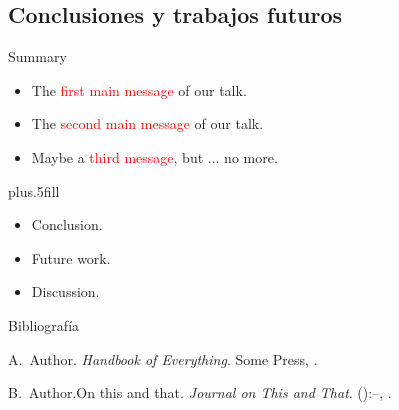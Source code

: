 \documentclass{beamer}
\begin{document}
\subsection{Conclusiones y trabajos futuros}

\begin{frame}{Summary}
	\begin{itemize}
		\item The \textcolor{red}{first main message} of our talk.
		\item The \textcolor{red}{second main message} of our talk.
		\item Maybe a \textcolor{red}{third message}, but ... no more.
	\end{itemize}
	\vskip0pt plus.5fill
	\begin{itemize}
		\item Conclusion.
	\end{itemize}
	\begin{itemize}
		\item Future work.
		\item Discussion.
	\end{itemize}
\end{frame}

\begin{frame}{Bibliografía}
	\begin{thebibliography}{2}
		\beamertemplatebookbibitems
		A.\ Author. \newblock\emph{Handbook of Everything}.\newblock
\textlatin{Some Press, }.

		\beamertemplatearticlebibitems
		B.\ Author.\newblock On this and that\emph{.}
\newblock\emph{Journal on This and That}. 
():--, 
.
	\end{thebibliography}
\end{frame}
\end{document}
